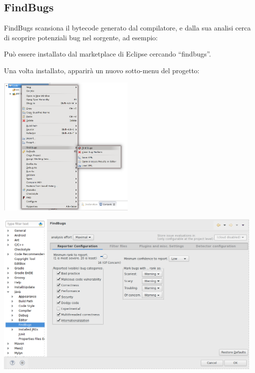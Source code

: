 \documentclass[presentation]{beamer}
\begin{document}
\subsection{FindBugs}

 {
   {
      FindBugs scansiona il bytecode generato dal compilatore, e dalla sua analisi cerca di scoprire potenziali bug nel sorgente, ad esempio:
  }
}

 {
	 {
		Può essere installato dal marketplace di Eclipse cercando ``findbugs''.
		
		Una volta installato, apparirà un nuovo sotto-menu del progetto:
		
		\centering
		\includegraphics[width=0.5\textwidth]{img/findbugs}
	}
}

 {
	\centering
	\includegraphics[width=0.99\textwidth]{img/findbugsconf}
}
\end{document}

